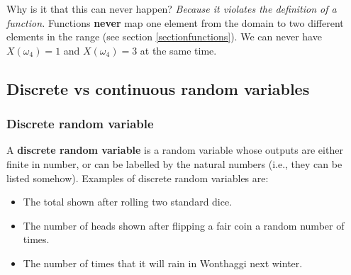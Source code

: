 \begin{center}
\end{center}
Why is it that this can never happen? \textit{Because it violates the definition of a function.} Functions \textbf{never} map one element from the domain to two different elements in the range (see section \ref{sectionfunctions}). We can never have $X(\omega_4) = 1$ and $X(\omega_4) = 3$ at the same time.

\subsection{Discrete vs continuous random variables} \label{discrete random variable}
\subsubsection{Discrete random variable}
A \textbf{discrete random variable} is a random variable whose outputs are either finite in number, or can be labelled by the natural numbers (i.e., they can be listed somehow). Examples of discrete random variables are:
\begin{itemize}
\item The total shown after rolling two standard dice.
\item The number of heads shown after flipping a fair coin a random number of times.
\item The number of times that it will rain in Wonthaggi next winter.
\end{itemize}

